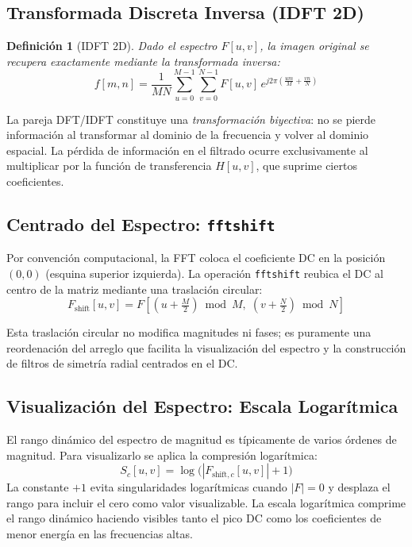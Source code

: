 \documentclass[conference]{IEEEtran}
\newtheorem{definicion}{Definición}
\begin{document}
\subsection{Transformada Discreta Inversa (IDFT 2D)}

\begin{definicion}[IDFT 2D]
  Dado el espectro $F[u,v]$, la imagen original se recupera exactamente
  mediante la transformada inversa:
  \begin{equation}
    f[m,n] = \frac{1}{MN}\sum_{u=0}^{M-1}\sum_{v=0}^{N-1}
             F[u,v]\,e^{j2\pi\!\left(\frac{um}{M}+\frac{vn}{N}\right)}
    \label{eq:idft2d}
  \end{equation}
\end{definicion}

La pareja DFT/IDFT constituye una \textit{transformación biyectiva}: no
se pierde información al transformar al dominio de la frecuencia y volver
al dominio espacial. La pérdida de información en el filtrado ocurre
exclusivamente al multiplicar por la función de transferencia $H[u,v]$,
que suprime ciertos coeficientes.

\subsection{Centrado del Espectro: \texttt{fftshift}}

Por convención computacional, la FFT coloca el coeficiente DC en la
posición $(0,0)$ (esquina superior izquierda). La operación \texttt{fftshift}
reubica el DC al centro de la matriz mediante una traslación circular:
\begin{equation}
  F_{\text{shift}}[u,v] = F\!\left[\left(u+\tfrac{M}{2}\right)\!\bmod M,\;
                           \left(v+\tfrac{N}{2}\right)\!\bmod N\right]
  \label{eq:fftshift}
\end{equation}

Esta traslación circular no modifica magnitudes ni fases; es puramente
una reordenación del arreglo que facilita la visualización del espectro
y la construcción de filtros de simetría radial centrados en el DC.

\subsection{Visualización del Espectro: Escala Logarítmica}

El rango dinámico del espectro de magnitud es típicamente de varios
órdenes de magnitud. Para visualizarlo se aplica la compresión logarítmica:
\begin{equation}
  S_c[u,v] = \log\!\bigl(|F_{\text{shift},c}[u,v]| + 1\bigr)
  \label{eq:log_spectrum}
\end{equation}
La constante $+1$ evita singularidades logarítmicas cuando $|F|=0$ y
desplaza el rango para incluir el cero como valor visualizable. La escala
logarítmica comprime el rango dinámico haciendo visibles tanto el pico DC
como los coeficientes de menor energía en las frecuencias altas.
\end{document}
